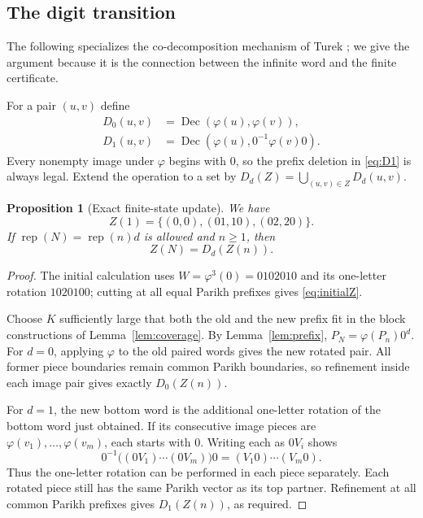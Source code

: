 \documentclass[11pt,a4paper]{article}
\newtheorem{proposition}[theorem]{Proposition}
\theoremstyle{definition}
\theoremstyle{remark}
\newcommand{\Dec}{\operatorname{Dec}}
\newcommand{\rep}{\operatorname{rep}}
\begin{document}
\subsection{The digit transition}
The following specializes the co-decomposition mechanism of Turek
\cite{Turek}; we give the argument because it is the connection between the
infinite word and the finite certificate.

For a pair $(u,v)$ define
\begin{align}
 D_0(u,v)&=\Dec(\varphi(u),\varphi(v)),\label{eq:D0}\\
 D_1(u,v)&=\Dec(\varphi(u),0^{-1}\varphi(v)0).\label{eq:D1}
\end{align}
Every nonempty image under $\varphi$ begins with $0$, so the prefix deletion
in \eqref{eq:D1} is always legal. Extend the operation to a set by
$D_d(Z)=\bigcup_{(u,v)\in Z}D_d(u,v)$.

\begin{proposition}[Exact finite-state update]\label{prop:transition}
We have
\begin{equation}\label{eq:initialZ}
 Z(1)=\{(0,0),(01,10),(02,20)\}.
\end{equation}
If $\rep(N)=\rep(n)d$ is allowed and $n\ge1$, then
\begin{equation}\label{eq:Ztransition}
 Z(N)=D_d(Z(n)).
\end{equation}
\end{proposition}
\begin{proof}
The initial calculation uses $W=\varphi^3(0)=0102010$ and its one-letter
rotation $1020100$; cutting at all equal Parikh prefixes gives
\eqref{eq:initialZ}.

Choose $K$ sufficiently large that both the old and the new prefix fit in
the block constructions of Lemma~\ref{lem:coverage}. By
Lemma~\ref{lem:prefix}, $P_N=\varphi(P_n)0^d$. For $d=0$, applying
$\varphi$ to the old paired words gives the new rotated pair. All former
piece boundaries remain common Parikh boundaries, so refinement inside each
image pair gives exactly $D_0(Z(n))$.

For $d=1$, the new bottom word is the additional one-letter rotation of the
bottom word just obtained. If its consecutive image pieces are
$\varphi(v_1),\ldots,\varphi(v_m)$, each starts with $0$. Writing each as
$0V_i$ shows
\[
 0^{-1}\bigl((0V_1)\cdots(0V_m)\bigr)0
   =(V_1 0)\cdots(V_m 0).
\]
Thus the one-letter rotation can be performed in each piece separately.
Each rotated piece still has the same Parikh vector as its top partner.
Refinement at all common Parikh prefixes gives $D_1(Z(n))$, as required.
\end{proof}
\end{document}
